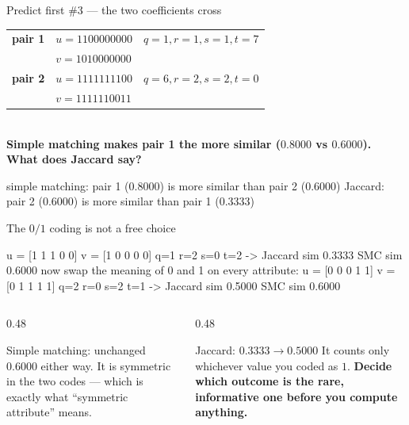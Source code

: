 \documentclass[aspectratio=169]{beamer}
\begin{document}
\begin{frame}[fragile,shrink=10]{Predict first \#3 --- the two coefficients cross}
  \begin{exampleblock}{}
    \centering\small
    \begin{tabular}{lll}
      \textbf{pair 1} & $u = 1100000000$ & $q=1, r=1, s=1, t=7$ \\
                      & $v = 1010000000$ & \\[0.3em]
      \textbf{pair 2} & $u = 1111111100$ & $q=6, r=2, s=2, t=0$ \\
                      & $v = 1111110011$ & \\
    \end{tabular}\\[0.4em]
    \textbf{Simple matching makes pair 1 the more similar
    ($0.8000$ vs $0.6000$). What does Jaccard say?}
  \end{exampleblock}
\begin{outblk}
simple matching: pair 1 (0.8000) is more similar than pair 2 (0.6000)
Jaccard:         pair 2 (0.6000) is more similar than pair 1 (0.3333)
\end{outblk}
\end{frame}

\begin{frame}[fragile]{The $0/1$ coding is not a free choice}
\begin{outblk}
u = [1 1 1 0 0]   v = [1 0 0 0 0]
   q=1 r=2 s=0 t=2 ->  Jaccard sim 0.3333    SMC sim 0.6000
now swap the meaning of 0 and 1 on every attribute:
u = [0 0 0 1 1]   v = [0 1 1 1 1]
   q=2 r=0 s=2 t=1 ->  Jaccard sim 0.5000    SMC sim 0.6000
\end{outblk}
  \begin{columns}[T]
    \begin{column}{0.48\textwidth}
      \begin{block}{Simple matching: unchanged}
        $0.6000$ either way. It is symmetric in the two codes --- which is
        exactly what ``symmetric attribute'' means.
      \end{block}
    \end{column}
    \begin{column}{0.48\textwidth}
      \begin{alertblock}{Jaccard: $0.3333 \to 0.5000$}
        It counts only whichever value you coded as $1$. \textbf{Decide
        which outcome is the rare, informative one before you compute
        anything.}
      \end{alertblock}
    \end{column}
  \end{columns}
\end{frame}
\end{document}
